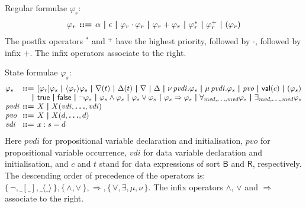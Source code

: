 \documentclass[a4paper,fleqn,10pt]{article}
\makeatletter
\newcommand{\f}[1]{\ensuremath{\mathit{#1}}}
\newcommand{\sbool}{\ensuremath{\mathsf{B}}}
\newcommand{\sreal}{\ensuremath{\mathsf{R}}}
\newenvironment{tightarray}[1]
  {\setlength{\arraycolsep}{2pt}%
   \begin{array}{@{}#1@{}}%
  }
  {\end{array}%
  }
\newcommand{\set}[1]{\ensuremath{\{\,#1\,\}}}
\newcommand{\limp}{\ensuremath{\Rightarrow}}
\newcommand{\mb}[1]{\text{\boldmath$#1$}}
\makeatother
\begin{document}
Regular formulae $\varphi_r$:
\[\begin{tightarray}{lrl}
\varphi_r & \mb{::=} & \alpha\ \mb{|}\ 
                       \epsilon\ \mb{|}\ 
                       \varphi_r \cdot \varphi_r\ \mb{|}\ 
                       \varphi_r + \varphi_r\ \mb{|}\ 
                       \varphi_r^{*} \ \mb{|}\ 
                       \varphi_r^{+} \ \mb{|}\ 
                       ( \varphi_r )
\end{tightarray}\]
The postfix operators ${}^{*}$ and ${}^{+}$ have the highest priority, followed
by $\cdot$, followed by infix $+$. The infix operators associate to the right.

State formulae $\varphi_s$:
\[\begin{tightarray}{lrl}
\varphi_s & \mb{::=} & [\varphi_r]\varphi_s\ \mb{|}\ 
                       \langle\varphi_r\rangle\varphi_s\ \mb{|}\ 
                       \nabla(t)\ \mb{|}\ 
                       \Delta(t)\ \mb{|}\ 
                       \nabla\ \mb{|}\ 
                       \Delta\ \mb{|}\ 
                       \nu\,\f{pvdi}.\varphi_s\ \mb{|}\ 
                       \mu\,\f{pvdi}.\varphi_s\ \mb{|}\ 
                       \f{pvo}\ \mb{|}\ 
                       \mathsf{val}(c)\ \mb{|}\ 
                       ( \varphi_s )\\
          & \mb{|}   & \mathsf{true}\ \mb{|}\ 
                       \mathsf{false}\ \mb{|}\ 
                       \neg \varphi_s\ \mb{|}\ 
                       \varphi_s \land \varphi_s\ \mb{|}\ 
                       \varphi_s \lor  \varphi_s\ \mb{|}\ 
                       \varphi_s \limp \varphi_s\ \mb{|}\ 
                       \forall_{\f{mvd},\mb{\ldots},\f{mvd}} \varphi_s\ \mb{|}\ 
                       \exists_{\f{mvd},\mb{\ldots},\f{mvd}} \varphi_s\\
\f{pvdi} & \mb{::=} & X\ \mb{|}\ X(\f{vdi},\mb{\ldots},\f{vdi})\\
\f{pvo}  & \mb{::=} & X\ \mb{|}\ X(d,\mb{\ldots},d)\\
\f{vdi}  & \mb{::=} & x: s = d\\
\end{tightarray}\]
Here 
$\f{pvdi}$ for propositional variable declaration and initialisation,
$\f{pvo}$ for propositional variable occurrence,
$\f{vdi}$ for data variable declaration and initialisation,
and $c$ and $t$ stand for data expressions of
sort $\sbool$ and $\sreal$, respectively.  The descending order of precedence
of the operators is: $\set{\neg, \_[\_], \_\langle\_\rangle},
\set{\land,\lor}, \limp, \set{\forall, \exists, \mu, \nu}$.  The infix
operators $\land$, $\lor$ and $\limp$ associate to the right.
\end{document}
